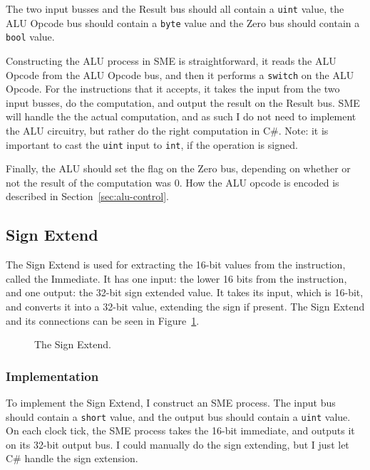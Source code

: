 The two input busses and the Result bus should all contain a \texttt{uint}
value, the ALU Opcode bus should contain a \texttt{byte} value and the Zero bus
should contain a \texttt{bool} value.

Constructing the ALU process in SME is straightforward, it reads the ALU Opcode
from the ALU Opcode bus, and then it performs a \texttt{switch} on the ALU Opcode.
For the instructions that it accepts, it takes the input from the two input
busses, do the computation, and output the result on the Result bus. SME will
handle the the actual computation, and as such I do not need to implement the
ALU circuitry, but rather do the right computation in C\#. Note: it is
important to cast the \texttt{uint} input to \texttt{int}, if the operation is
signed.

Finally, the ALU should set the flag on the Zero bus, depending on whether or
not the result of the computation was 0. How the ALU opcode is encoded is
described in Section~\ref{sec:alu-control}.

\subsection{Sign Extend}
The Sign Extend is used for extracting the 16-bit values from the instruction,
called the Immediate. It has one input: the lower 16 bits from the
instruction, and one output: the 32-bit sign extended value. It takes its
input, which is 16-bit, and converts it into a 32-bit value, extending the sign
if present. The Sign Extend and its connections can be seen in
Figure~\ref{fig:sign}.

\begin{figure}
    \centering
    \caption{The Sign Extend.}
    \label{fig:sign}
\end{figure}

\subsubsection*{Implementation}
To implement the Sign Extend, I construct an SME process. The input bus should
contain a \texttt{short} value, and the output bus should contain a
\texttt{uint} value. On each clock tick, the SME process takes the 16-bit
immediate, and outputs it on its 32-bit output bus. I could manually do the
sign extending, but I just let C\# handle the sign extension.

